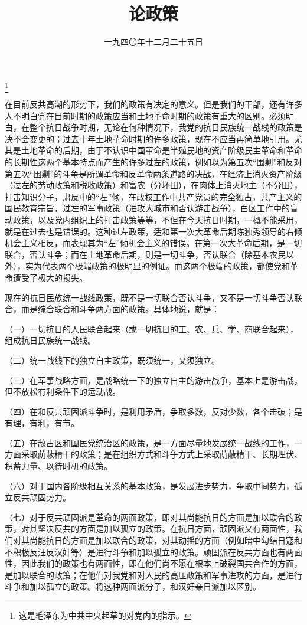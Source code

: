 
\title{论政策}
\date{一九四〇年十二月二十五日}
\thanks{这是毛泽东为中共中央起草的对党内的指示。}
\maketitle


在目前反共高潮的形势下，我们的政策有决定的意义。但是我们的干部，还有许多人不明白党在目前时期的政策应当和土地革命时期的政策有重大的区别。必须明白，在整个抗日战争时期，无论在何种情况下，我党的抗日民族统一战线的政策是决不会变更的；过去十年土地革命时期的许多政策，现在不应当再简单地引用。尤其是土地革命的后期，由于不认识中国革命是半殖民地的资产阶级民主革命和革命的长期性这两个基本特点而产生的许多过左的政策，例如以为第五次“围剿”和反对第五次“围剿”的斗争是所谓革命和反革命两条道路的决战，在经济上消灭资产阶级（过左的劳动政策和税收政策）和富农（分坏田），在肉体上消灭地主（不分田），打击知识分子，肃反中的“左”倾，在政权工作中共产党员的完全独占，共产主义的国民教育宗旨，过左的军事政策（进攻大城市和否认游击战争），白区工作中的盲动政策，以及党内组织上的打击政策等等，不但在今天抗日时期，一概不能采用，就是在过去也是错误的。这种过左政策，适和第一次大革命后期陈独秀领导的右倾机会主义相反，而表现其为“左”倾机会主义的错误。在第一次大革命后期，是一切联合，否认斗争；而在土地革命后期，则是一切斗争，否认联合（除基本农民以外），实为代表两个极端政策的极明显的例证。而这两个极端的政策，都使党和革命遭受了极大的损失。

现在的抗日民族统一战线政策，既不是一切联合否认斗争，又不是一切斗争否认联合，而是综合联合和斗争两方面的政策。具体地说，就是：

（一）一切抗日的人民联合起来（或一切抗日的工、农、兵、学、商联合起来），组成抗日民族统一战线。

（二）统一战线下的独立自主政策，既须统一，又须独立。

（三）在军事战略方面，是战略统一下的独立自主的游击战争，基本上是游击战，但不放松有利条件下的运动战。

（四）在和反共顽固派斗争时，是利用矛盾，争取多数，反对少数，各个击破；是有理，有利，有节。

（五）在敌占区和国民党统治区的政策，是一方面尽量地发展统一战线的工作，一方面采取荫蔽精干的政策；是在组织方式和斗争方式上采取荫蔽精干、长期埋伏、积蓄力量、以待时机的政策。

（六）对于国内各阶级相互关系的基本政策，是发展进步势力，争取中间势力，孤立反共顽固势力。

（七）对于反共顽固派是革命的两面政策，即对其尚能抗日的方面是加以联合的政策，对其坚决反共的方面是加以孤立的政策。在抗日方面，顽固派又有两面性，我们对其尚能抗日的方面是加以联合的政策，对其动摇的方面（例如暗中勾结日寇和不积极反汪反汉奸等）是进行斗争和加以孤立的政策。顽固派在反共方面也有两面性，因此我们的政策也有两面性，即在他们尚不愿在根本上破裂国共合作的方面，是加以联合的政策；在他们对我党和对人民的高压政策和军事进攻的方面，是进行斗争和加以孤立的政策。将这种两面派分子，和汉奸亲日派加以区别。

